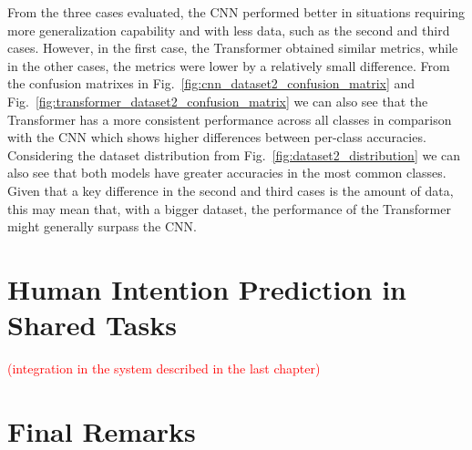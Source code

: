 From the three cases evaluated, the CNN performed better in situations requiring more generalization capability and with less data, such as the second and third cases. However, in the first case, the Transformer obtained similar metrics, while in the other cases, the metrics were lower by a relatively small difference. From the confusion matrixes in Fig.~\ref{fig:cnn_dataset2_confusion_matrix} and Fig.~\ref{fig:transformer_dataset2_confusion_matrix} we can also see that the Transformer has a more consistent performance across all classes in comparison with the CNN which shows higher differences between per-class accuracies. Considering the dataset distribution from Fig.~\ref{fig:dataset2_distribution} we can also see that both models have greater accuracies in the most common classes. Given that a key difference in the second and third cases is the amount of data, this may mean that, with a bigger dataset, the performance of the Transformer might generally surpass the CNN.

\section{Human Intention Prediction in Shared Tasks}
\label{section:human_intention_prediction}

\textcolor{red}{(integration in the system described in the last chapter)}

\section{Final Remarks}
\label{section:learning_final_remarks}
